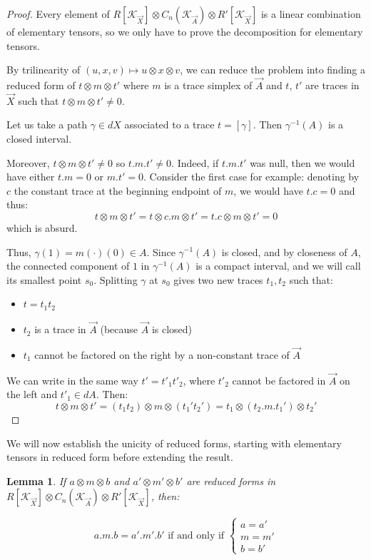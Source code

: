 \documentclass[a4paper,fleqn]{cas-sc}
\newtheorem{lem}[thm]{Lemma}
\newcommand{\K}{\mathcal{K}}
\begin{document}
\begin{proof}
Every element of $R[\K_{\Vec{X}}] \otimes C_n(\K_{\Vec{A}}) \otimes R'[\K_{\Vec{X}}]$ is a linear combination of elementary tensors, so we only have to prove the decomposition for elementary tensors.

By trilinearity of $(u, x, v) \mapsto u \otimes x \otimes v$, we can reduce the problem into finding a reduced form of $t \otimes m \otimes t'$ where $m$ is a trace simplex of $\Vec{A}$ and $t$, $t'$ are traces in $\Vec{X}$ such that $t \otimes m \otimes t' \neq 0$. 

Let us  take a path $\gamma \in dX$ associated to a trace $t = [\gamma]$. Then $\gamma^{-1}(A)$ is a closed interval.

 Moreover, $t \otimes m \otimes t' \neq 0$ so $t .m.t' \neq 0$. Indeed, if $t.m.t'$ was null, then we would have either $t.m = 0$ or $m.t' = 0$. Consider the first case for example: denoting by $c$ the constant trace at the beginning endpoint of $m$, we would have $t.c = 0$ and thus:
 \[
 t \otimes m \otimes t' = 
 t \otimes c.m \otimes t' =
 t.c \otimes m \otimes t' = 0
 \]
 \noindent which is absurd.
 
 Thus, $\gamma(1) = m(\cdot)(0) \in A$. Since $\gamma^{-1}(A)$ is closed, and by closeness of $A$, the connected component of $1$ in $\gamma^{-1}(A)$ is a compact interval, and we will call its smallest point $s_0$. Splitting $\gamma$ at $s_0$ gives two new traces $t_1, t_2$ such that:
\begin{itemize}
    \item $t = t_1 t_2$
    \item $t_2$ is a trace in $\Vec{A}$ (because $\Vec{A}$ is closed) 
    \item $t_1$ cannot be factored on the right by a non-constant trace of $\Vec{A}$
\end{itemize}

We can write in the same way $t' = t'_1 t'_2$, where $t'_2$ cannot be factored in $\Vec{A}$ on the left and $t'_1 \in dA$. Then:
\[
t \otimes m \otimes t' =
(t_1 t_2) \otimes m \otimes (t_1' t_2') =
t_1 \otimes (t_2.m.t_1') \otimes t_2'
\]
\end{proof}

We will now establish the unicity of reduced forms, starting with elementary tensors in reduced form before extending the result. 


\begin{lem}
If $a\otimes m \otimes b$ and $a'\otimes m' \otimes b'$ are reduced forms in $R[\K_{\Vec{X}}] \otimes C_n(\K_{\Vec{A}}) \otimes R'[\K_{\Vec{X}}]$, then: 

\[
a.m.b = a'.m'.b'
\text{ if and only if }
\begin{cases}
a = a' \\
m = m' \\
b = b'
\end{cases}
\]

\end{lem}
\end{document}
